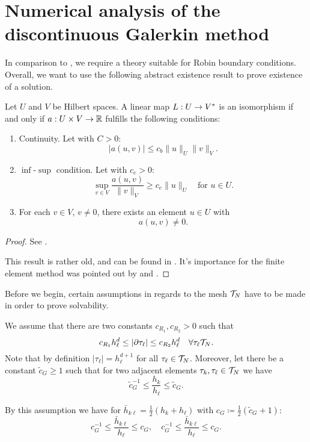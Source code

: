 \documentclass[../thesis.tex]{subfiles}
\begin{document}
\chapter{Numerical analysis of the discontinuous Galerkin method}
\label{sec:dG-numerics}
In comparison to \cite{Neumueller}, we require a theory suitable for Robin boundary conditions.
Overall, we want to use the following abstract existence result to prove existence of a solution.
\begin{theorem}
\label{thm:Necas-Babuska}
Let $U$ and $V$ be Hilbert spaces. A linear map $L : U \to V^*$ is an isomorphism if and only if $a : U \times V \to \mathbb{R}$ fulfills the following conditions:
\begin{enumerate}
\item Continuity. Let with $C > 0$:
\[
	| a(u, v) | \leq c_b \| u \|_U \| v \|_V.
\]
\item $\inf$-$\sup$ condition. Let with $c_e > 0$:
\[
	\sup_{v \in V} \frac{a(u, v)}{\| v \|_V} \geq c_e \| u \|_U \quad \text{for } u \in U.
\] 
\item For each $v \in V$, $v \neq 0$, there exists an element $u \in U$ with
\[
	a(u, v) \neq 0.
\]
\end{enumerate}
\end{theorem}
\begin{proof}
See \cite[3.6 Satz]{Braess}.

This result is rather old, and can be found in \cite{Necas}. It's importance for the finite element method was pointed out by \cite{Babuska71} and \cite{BabuskaAziz}.
\end{proof}
Before we begin, certain assumptions in regards to the mesh $\mathcal{T}_N$ have to be made in order to prove solvability.
\begin{assumption}
\label{as:mesh-assumptions}
We assume that there are two constants $c_{R_1}, c_{R_2} > 0$ such that
\[
	c_{R_1} h_\ell^d \leq |\partial \tau_\ell| \leq c_{R_2} h_\ell^d \quad \forall \tau_\ell \mathcal{T}_N.
\]
Note that by definition $|\tau_\ell| = h_\ell^{d+1}$ for all $\tau_\ell \in \mathcal{T}_N$.
Moreover, let there be a constant $\tilde{c}_G \geq 1$ such that for two adjacent elements $\tau_k, \tau_\ell \in \mathcal{T}_N$ we have
\[
	\tilde{c}_G^{-1} \leq \frac{h_k}{h_\ell} \leq \tilde{c}_G.
\]
\end{assumption}
By this assumption we have for $\bar{h}_{k\ell} = \frac{1}{2} (h_k + h_\ell)$ with $c_G \coloneqq \frac{1}{2} (\tilde{c}_G + 1)$:
\[
	c_G^{-1} \leq \frac{\bar{h}_{k\ell}}{h_\ell} \leq c_G, \quad c_G^{-1} \leq \frac{\bar{h}_{k\ell}}{h_\ell} \leq c_G.
\]
\end{document}
